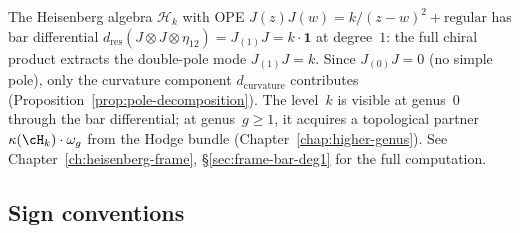 \begin{example}\label{ex:heisenberg-d-deg1}
\label{ex:free-boson-d-deg1}
The Heisenberg algebra $\mathcal{H}_k$ with OPE $J(z)J(w) = k/(z-w)^2 + \text{regular}$ has bar differential
$d_{\mathrm{res}}(J \otimes J \otimes \eta_{12}) = J_{(1)}J = k \cdot \mathbf{1}$
at degree~$1$: the full chiral product extracts the double-pole mode $J_{(1)}J = k$. Since $J_{(0)}J = 0$ (no simple pole), only the curvature component $d_{\mathrm{curvature}}$ contributes (Proposition~\ref{prop:pole-decomposition}). The level~$k$ is visible at genus~$0$ through the bar differential; at genus~$g \geq 1$, it acquires a topological partner $\kappa(\cH_k)\cdot\omega_g$ from the Hodge bundle (Chapter~\ref{chap:higher-genus}). See Chapter~\ref{ch:heisenberg-frame}, \S\ref{sec:frame-bar-deg1} for the full computation.
\end{example}


\subsection{Sign conventions}\label{sec:sign-conventions}

